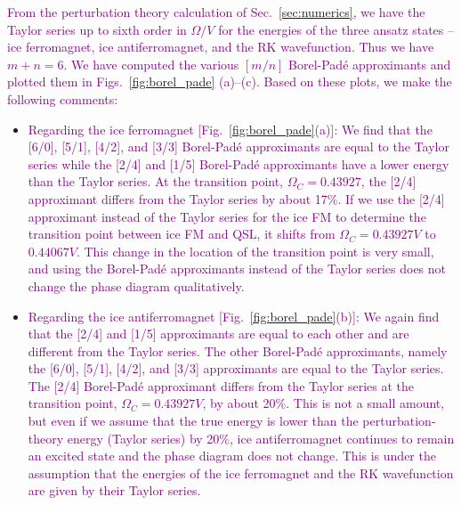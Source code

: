 \documentclass[twocolumn,superscriptaddress,amsmath,amssymb,aps,prx,nofootinbib]{revtex4-2}
\newcommand{\newtext}[1]{\textcolor{purple}{#1}}
\begin{document}
\newtext{From the perturbation theory calculation of Sec.~\ref{sec:numerics}, we have the Taylor series up to sixth order in $\Omega/V$ for the energies of the three ansatz states -- ice ferromagnet, ice antiferromagnet, and the RK wavefunction. Thus we have $m+n=6$. We have computed the various $[m/n]$ Borel-Pad\'e approximants and plotted them in Figs.~\ref{fig:borel_pade} (a)--(c). Based on these plots, we make the following comments:}
\begin{itemize}
    \item \newtext{Regarding the ice ferromagnet [Fig.~\ref{fig:borel_pade}(a)]: We find that the [6/0], [5/1], [4/2],  and [3/3] Borel-Pad\'e approximants are equal to the Taylor series while the [2/4] and [1/5] Borel-Pad\'e approximants have a lower energy than the Taylor series.
    At the transition point, $\Omega_C = 0.43927$, the [2/4] approximant differs from the Taylor series by about 17\%.
    If we use the [2/4] approximant instead of the Taylor series for the ice FM to determine the transition point between ice FM and QSL, it shifts from $\Omega_C = 0.43927 V$ to $0.44067 V$. 
    This change in the location of the transition point is very small, and using the Borel-Pad\'e approximants instead of the Taylor series does not change the phase diagram qualitatively.}
    \item \newtext{Regarding the ice antiferromagnet [Fig.~\ref{fig:borel_pade}(b)]: We again find that the [2/4] and [1/5] approximants are equal to each other and are different from the Taylor series. The other Borel-Pad\'e approximants, namely the [6/0], [5/1], [4/2], and [3/3] approximants are equal to the Taylor series. The [2/4] Borel-Pad\'e approximant differs from the Taylor series at the transition point, $\Omega_C = 0.43927 V$, by about 20\%. This is not a small amount, but even if we assume that the true energy is lower than the perturbation-theory energy (Taylor series) by 20\%, ice antiferromagnet continues to remain an excited state and the phase diagram does not change. This is under the assumption that the energies of the ice ferromagnet and the RK wavefunction are given by their Taylor series.}


\end{itemize}
\end{document}
